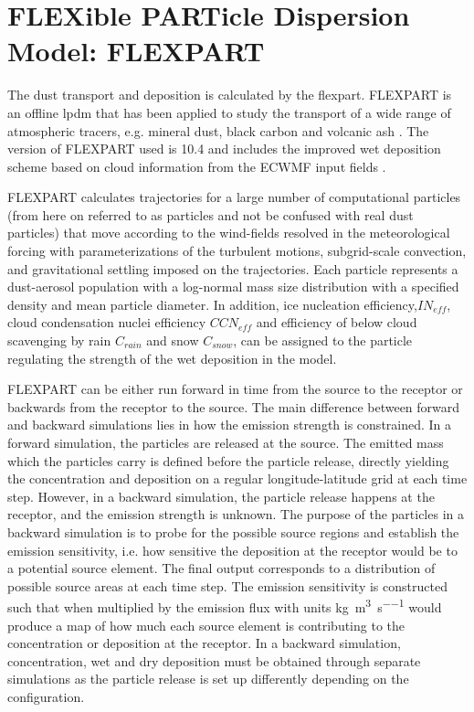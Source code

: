 \section{FLEXible PARTicle Dispersion Model: FLEXPART}
\par The dust transport and deposition is calculated by the \acrfull{flexpart}. FLEXPART is an offline \acrshort{lpdm} that has been applied to study the transport of a wide range of atmospheric tracers, e.g. mineral dust, black carbon and volcanic ash \parencite{flexdust_ref_2016,choi_investigation_2020, eckhardt2008estimation}. 
The version of FLEXPART used is 10.4 and includes the improved wet deposition scheme based on cloud information from the ECWMF input fields \parencite{flexpart_wetdep}. 
\par FLEXPART calculates trajectories for a large number of computational particles (from here on referred to as particles and not be confused with real dust particles) that move according to the wind-fields resolved in the meteorological forcing with parameterizations of the turbulent motions, subgrid-scale convection, and gravitational settling imposed on the trajectories. 
Each particle represents a dust-aerosol population with a log-normal mass size distribution with a specified density and mean particle diameter. 
In addition, ice nucleation efficiency,$IN_{eff}$, cloud condensation nuclei efficiency $CCN_{eff}$ and efficiency of below cloud scavenging by rain $C_{rain}$ and snow $C_{snow}$, can be assigned to the particle regulating the strength of the wet deposition in the model.   

FLEXPART can be either run forward in time from the source to the receptor or backwards from the receptor to the source. The main difference between forward and backward simulations lies in how the emission strength is constrained. 
In a forward simulation, the particles are released at the source. 
The emitted mass which the particles carry is defined before the particle release, directly yielding the concentration and deposition on a regular longitude-latitude grid at each time step.
However, in a backward simulation, the particle release happens at the receptor, and the emission strength is unknown. 
The purpose of the particles in a backward simulation is to probe for the possible source regions and establish the emission sensitivity, i.e. how sensitive the deposition at the receptor would be to a potential source element. 
The final output corresponds to a distribution of possible source areas at each time step.
The emission sensitivity is constructed such that when multiplied by the emission flux with units \si{\kg\per\cubic\metre\per\s} would produce a map of how much each source element is contributing to the concentration or deposition at the receptor.
In a backward simulation, concentration, wet and dry deposition must be obtained through separate simulations as the particle release is set up differently depending on the configuration.  
